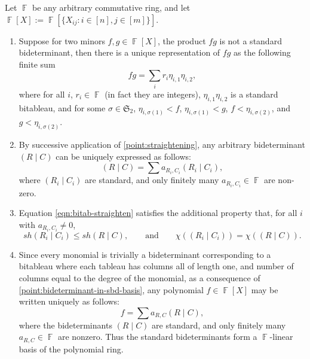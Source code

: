 \documentclass[11pt,reqno]{amsart}
\DeclareMathOperator{\F}{\mathbb{F}}
\newcommand{\bidet}[2]{(#1\;|\;#2)}
\newcommand{\shapebitab}{sh}
\theoremstyle{definition}
\numberwithin{equation}{section}
\begin{document}
\begin{theorem}
\label{thm:straightening}
Let $\F$ be any arbitrary commutative ring, and let $\F[X] := \F[\{X_{ij} : i \in [n], j \in [m]\}]$.
\begin{enumerate}[label=(\Roman*),ref=(\Roman*),itemindent=-10pt]
\item \label{point:straightening} Suppose for two minors $f, g \in \F[X]$, the product $fg$ is not a standard bideterminant, then there is a unique representation of $fg$ as the following finite sum
\[fg = \sum_i {r_i} \eta_{i, 1} \eta_{i, 2},\]
where for all $i$, $r_i \in \F$ (in fact they are integers), $\eta_{i, 1} \eta_{i, 2}$ is a standard bitableau, and for some $\sigma \in \mathfrak{S}_2$, $\eta_{i, \sigma(1)} < f$, $\eta_{i, \sigma(1)} < g$, $f < \eta_{i, \sigma(2)}$, and $g < \eta_{i, \sigma(2)}$.
\item \label{point:bideterminant-in-sbd-basis} By successive application of \ref{point:straightening}, any arbitrary bideterminant $\bidet{R}{C}$ can be uniquely expressed as follows:
\begin{equation} \label{eqn:bitab-straighten} \bidet{R}{C} = \sum a_{R_i, C_i} \bidet{R_i}{C_i}, \end{equation} where $\bidet{R_i}{C_i}$ are standard, and only finitely many $a_{R_i, C_i} \in \F$ are non-zero. 
\item \label{point:straightening-orders} Equation \eqref{eqn:bitab-straighten} satisfies the additional property that, for all $i$ with $a_{R_i, C_i} \neq 0$, \[\shapebitab{\bidet{R_i}{C_i}} \le \shapebitab{\bidet{R}{C}}, \qquad \text{and} \qquad \chi(\bidet{R_i}{C_i}) = \chi(\bidet{R}{C}).\]
\item \label{point:polynomial-in-bd-basis} Since every monomial is trivially a bideterminant corresponding to a bitableau where each tableau has columns all of length one, and number of columns equal to the degree of the monomial, as a consequence of \ref{point:bideterminant-in-sbd-basis}, any polynomial $f \in \F[X]$ may be written uniquely as follows: 
\begin{equation} \label{eqn:poly-bidet-basis} f = \sum a_{R, C} \bidet{R}{C}, \end{equation}
where the bideterminants $\bidet{R}{C}$ are standard, and only finitely many $a_{R,C} \in \F$ are nonzero. Thus the standard bideterminants form a $\F$-linear basis of the polynomial ring.
\end{enumerate}
\end{theorem}
\end{document}

